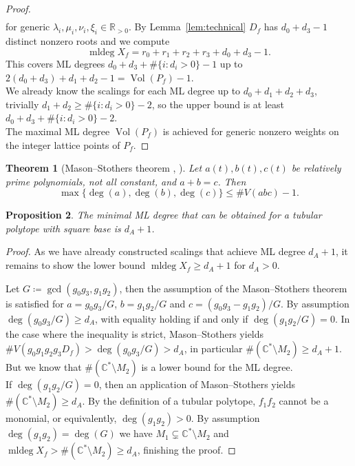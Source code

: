 \documentclass[12pt,reqno]{amsart}   	%
\theoremstyle{plain}
\newtheorem{theorem}{Theorem}[section]
\newtheorem{proposition}[theorem]{Proposition}
\theoremstyle{definition}
\theoremstyle{remark}
\newcommand{\R}{\mathbb{R}}
\newcommand{\C}{\mathbb{C}}
\newcommand{\vol}{\operatorname{Vol}}
\newcommand{\mldeg}{\operatorname{mldeg}}
\begin{document}
\begin{proof}
\[\begin{aligned}
\end{aligned}
    \]
    for generic $\lambda_i, \mu _i, \nu _i, \xi _i \in \R _{>0}$. By Lemma~\ref{lem:technical} $D_f$ has $d_0+d_3-1$ distinct nonzero roots and we compute
    \[
        \mldeg X_f = r_0+r_1+r_2+r_3+d_0+d_3-1.
    \]
 This covers ML degrees $d_0+d_3+\# \{ i \colon d_i > 0 \}-1$ up to $2(d_0+d_3)+d_1+d_2-1=\vol (P_f) - 1$. \\
 We already know the scalings for each ML degree up to $d_0+d_1+d_2+d_3$, trivially $d_1+d_2 \geq \# \{ i\colon d_i>0\}-2$, so the upper bound is at least $d_0+d_3+\# \{ i \colon d_i > 0 \}-2$. \\
 The maximal ML degree $\vol (P_f)$ is achieved for generic nonzero weights on the integer lattice points of $P_f$. 
\end{proof}


\begin{theorem}[Mason--Stothers theorem {\cite{stothers1981}, \cite[Chapter~IV, Theorem~7.1]{lang2002}}]
    Let $a(t),b(t),c(t)$ be relatively prime polynomials, not all constant, and $a+b=c$. Then
    \[
        \max \{ \deg (a) , \deg (b), \deg (c)\} \leq \# V(abc) - 1.   
    \]
\end{theorem}

\begin{proposition}
    The minimal ML degree that can be obtained for a tubular polytope with square base is $d_A+1$.
\end{proposition}
\begin{proof}
    As we have already constructed scalings that achieve ML degree $d_A+1$, it remains to show the lower bound $\mldeg X_f \geq d_A+1$ for $d_A > 0$. 
    
    Let $G \coloneqq \gcd  (g_0g_3,g_1g_2)$, then the assumption of the Mason--Stothers theorem is satisfied for $a=g_0g_3/G$, $b=g_1g_2/G$ and $c=(g_0g_3-g_1g_2)/G$. By assumption $\deg (g_0g_3/G) \geq d_A$, with equality holding if and only if $\deg (g_1g_2/G)=0$. In the case where the inequality is strict, Mason--Stothers yields $\# V(g_0g_1g_2g_3D_f) > \deg (g_0g_3/G) > d_A$, in particular $\#( \C^\ast \setminus M_2 )\geq d_A+1$. But we know that $\# (\C^\ast \setminus M_2)$ is a lower bound for the ML degree. \\ 
    
    
    If $\deg (g_1g_2/G) = 0$, then an application of Mason--Stothers yields $\# (\C^\ast \setminus M_2) \geq d_A$. By the definition of a tubular polytope, $f_1f_2$ cannot be a monomial, or equivalently, $\deg (g_1g_2)>0$. By assumption $\deg(g_1g_2)=\deg (G)$ we have $M_1 \subsetneq \C^\ast \setminus M_2$ and $\mldeg X_f > \# (\C^\ast \setminus M_2 )\geq d_A$, finishing the proof.
\end{proof}
\end{document}
